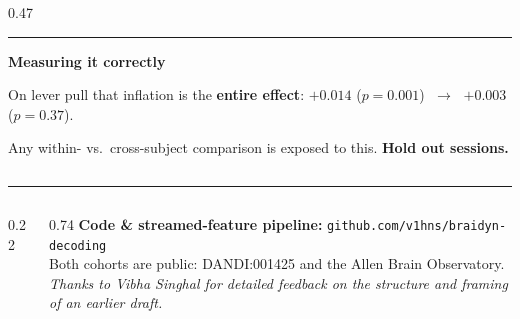 \documentclass[final,portrait]{beamer}
\newenvironment{psec}[1]{%
  \par\vspace{0.6em}%
  {\color{accent}\rule{\linewidth}{3pt}}\par\vspace{0.25em}%
  {\usebeamerfont*{frametitle}\bfseries\Large #1}\par\vspace{0.35em}%
}{\par\vspace{0.4em}}
\begin{document}
\begin{frame}[t]{}
\begin{columns}[t]
\begin{column}{0.47\linewidth}
\begin{psec}{Measuring it correctly}
\begin{tcolorbox}[colback=soft,colframe=accent,boxrule=2pt,arc=2mm]
\vspace{0.35em}
On lever pull that inflation is the \textbf{entire effect}:
$+0.014$ ($p=0.001$) $\;\rightarrow\;$ $+0.003$ ($p=0.37$).

\vspace{0.35em}
Any within- vs.\ cross-subject comparison is exposed to this. \textbf{Hold out sessions.}
\end{tcolorbox}
\end{psec}






\end{column}
\end{columns}

\vspace{0.3em}
{\color{rule}\rule{\linewidth}{2pt}}
\vspace{0.4em}
\begin{columns}[c]
\begin{column}{0.22\linewidth}
\centering{}
\end{column}
\begin{column}{0.74\linewidth}
{\small \textbf{Code \& streamed-feature pipeline:} \texttt{github.com/v1hns/braidyn-decoding}\\
Both cohorts are public: DANDI:001425 and the Allen Brain Observatory.\\[0.3em]
\textit{Thanks to Vibha Singhal for detailed feedback on the structure and framing of an earlier
draft.}}
\end{column}
\end{columns}

\end{frame}
\end{document}
